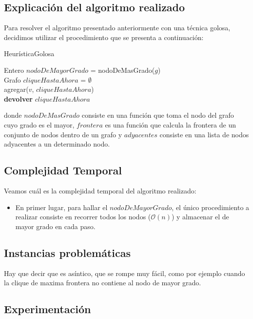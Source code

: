 \subsection{Explicación del algoritmo realizado}
Para resolver el algoritmo presentado anteriormente con una técnica golosa, decidimos utilizar el procedimiento que se presenta a continuación:\newline
\newline
\begin{algorithm}[H]
    \SetAlgoLined
    \caption{HeurísticaGolosa}
	Entero $nodoDeMayorGrado$ = nodoDeMasGrado($g$)\\
	Grafo $cliqueHastaAhora$ = $\emptyset$\\
	agregar($v$, $cliqueHastaAhora$)\\
\textbf{devolver} $cliqueHastaAhora$
\end{algorithm}

donde $nodoDeMasGrado$ consiste en una función que toma el nodo del grafo cuyo grado es el mayor, $frontera$ es una función que calcula la frontera de un conjunto de nodos dentro de un grafo y $adyacentes$ consiste en una lista de nodos adyacentes a un determinado nodo.\newline



\subsection{Complejidad Temporal}
Veamos cuál es la complejidad temporal del algoritmo realizado:
\begin{itemize}
\item En primer lugar, para hallar el $nodoDeMayorGrado$, el único procedimiento a realizar consiste en recorrer todos los nodos ($\mathcal{O}(n)$) y almacenar el de mayor grado en cada paso.
\end{itemize}
\subsection{Instancias problemáticas}
Hay que decir que es asíntico, que se rompe muy fácil, como por ejemplo cuando la clique de maxima frontera no contiene al nodo de mayor grado.
\subsection{Experimentación}



